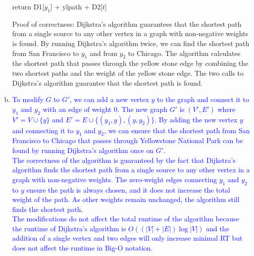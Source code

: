 \documentclass[10pt]{article}
\begin{document}
\begin{solution}
\begin{enumerate}[(a)]
\begin{algorithm}
\begin{algorithmic}[1]
                \State return D1[$y_1$] + ylpath + D2[$t$]
            \EndFunction
            \end{algorithmic}
        \end{algorithm}
        Proof of correctness: Dijkstra's algorithm guarantees that the shortest path from a single source to any other vertex in a graph with non-negative weights is found.
        By running Dijkstra's algorithm twice, we can find the shortest path from San Francisco to $y_1$ and from $y_2$ to Chicago. The algorithm calculates the shortest path that passes through the yellow stone edge by 
        combining the two shortest paths and the weight of the yellow stone edge. The two calls to Dijkstra's algorithm guarantee that the shortest path is found.
        \item \textcolor{blue}{
            To modify $G$ to $G'$, we can add a new vertex $y$ to the graph and connect it to $y_1$ and $y_2$ with an edge of weight 0. The new graph $G'$ is $(V', E')$ where $V' = V \cup \{y\}$ and $E' = E \cup \{(y_1, y), (y, y_2)\}$. By adding the new vertex $y$ and connecting it to $y_1$ and $y_2$, we can ensure that the shortest path from San Francisco to Chicago that passes through Yellowstone National Park can be found by running Dijkstra's algorithm once on $G'$. \\
            The correctness of the algorithm is guaranteed by the fact that Dijkstra's algorithm finds the shortest path from a single source to any other vertex in a graph with non-negative weights. The zero-weight edges connecting $y_1$ and $y_2$ to $y$ ensure the path is always chosen, and it does not increase the total weight of the path. As other weights remain unchanged, the algorithm still finds the shortest path.
            \\The modifications do not affect the total runtime of the algorithm because the runtime of Dijkstra's algorithm is $O((|V|+|E|)\log|V|)$ and the addition of a single vertex and two edges will only increase minimal RT but does not affect the runtime in Big-O notation. \\
 }

    \end{enumerate}


\end{solution}
\newpage


\end{document}
